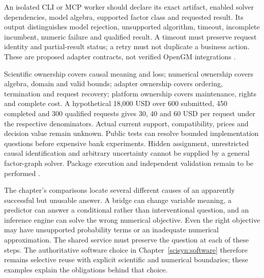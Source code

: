 An isolated CLI or MCP worker should declare its exact artifact, enabled
solver dependencies, model algebra, supported factor class and requested
result. Its output distinguishes model rejection, unsupported algorithm,
timeout, incomplete incumbent, numeric failure and qualified result. A
timeout must preserve request identity and partial-result status; a retry
must not duplicate a business action. These are proposed adapter contracts,
not verified OpenGM integrations \cite{exec24_opengm_choice}.

Scientific ownership covers causal meaning and loss; numerical ownership
covers algebra, domain and valid bounds; adapter ownership covers ordering,
termination and request recovery; platform ownership covers maintenance,
rights and complete cost. A hypothetical 18,000 USD over 600 submitted,
450 completed and 300 qualified requests gives 30, 40 and 60 USD per request
under the respective denominators. Actual current support, compatibility,
prices and decision value remain unknown. Public tests can resolve bounded
implementation questions before expensive bank experiments. Hidden
assignment, unrestricted causal identification and arbitrary uncertainty
cannot be supplied by a general factor-graph solver. Package execution and
independent validation remain to be performed
\cite{exec24_opengm_choice}.

The chapter's comparisons locate several different causes of an apparently
successful but unusable answer. A bridge can change variable meaning, a
predictor can answer a conditional rather than interventional question, and
an inference engine can solve the wrong numerical objective. Even the right
objective may have unsupported probability terms or an inadequate numerical
approximation. The shared service must preserve the question at each of
these steps. The authoritative software choice in
Chapter~\ref{scisyn:software} therefore remains selective reuse with explicit
scientific and numerical boundaries; these examples explain the obligations
behind that choice.
